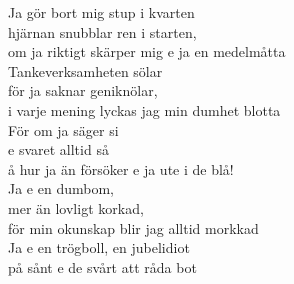 \noindent
\begin{minipage}{.475\textwidth}
    Ja gör bort mig stup i kvarten\\ 
    hjärnan snubblar ren i starten,\\
    om ja riktigt skärper mig e ja en medelmåtta\\
    Tankeverksamheten sölar\\ för ja saknar geniknölar,\\
    i varje mening lyckas jag min dumhet blotta\\
    För om ja säger si\\
    e svaret alltid så\\
    å hur ja än försöker e ja ute i de blå!\\


    Ja e en dumbom,\\
    mer än lovligt korkad,\\
    för min okunskap blir jag alltid morkkad\\
    Ja e en trögboll, en jubelidiot\\
    på sånt e de svårt att råda bot\\
\end{minipage}%
\hspace{0.075\textwidth}
\noindent
